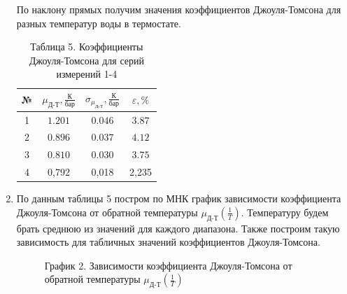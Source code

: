 \documentclass[a4paper]{article}
\renewcommand{\thefootnote}{\fnsymbol{footnote}}
\begin{document}
\begin{enumerate}
По наклону прямых получим значения коэффициентов Джоуля-Томсона для разных температур воды в термостате. 
\begin{table}[h!]
    \centering
    \begin{tabular}{|c|c|c|c|}
        \hline
        № & $\mu_{\text{Д-Т}}, \frac{\text{К}}{\text{бар}}$ & $\sigma_{\mu_{\text{Д-Т}}}, \frac{\text{К}}{\text{бар}}$ & $\varepsilon, \%$ \\
        \hline
        1 & $1.201$ & $0.046$ & $3.87$ \\
        \hline
        2 & $0.896$ & $0.037$ & $4.12$ \\
        \hline
        3 & $0.810$ & $0.030$ & $3.75$ \\
        \hline
	  4 & 0,792	&0,018&	2,235 \\
	  \hline
    \end{tabular}
    \caption{Таблица 5. Коэффициенты Джоуля-Томсона для серий измерений 1-4}
\end{table}
\renewcommand{\thefootnote}{*}
\item По данным таблицы 5 постром по МНК график зависимости коэффициента Джоуля-Томсона от обратной температуры $\mu_{\text{Д-Т}}(\frac{1}{T})$. Температуру будем брать среднюю из значений для каждого диапазона. Также построим такую зависимость для табличных значений\footnotemark{}  коэффициентов Джоуля-Томсона.

\renewcommand{\thefootnote}{\arabic{footnote}}
\clearpage
\begin{figure}[h!]
\caption[]{\label{} График 2. Зависимости коэффициента Джоуля-Томсона от обратной температуры $\mu_{\text{Д-Т}}(\frac{1}{T})$}
\end{figure}


\end{enumerate}
\end{document}
